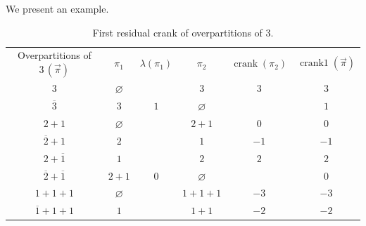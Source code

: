 \documentclass[10pt,a4paper]{amsart}
\numberwithin{equation}{section}
\begin{document}
We present an example.
\begin{table}[hbt!]\centering
\caption{First residual crank of overpartitions of $3$.}\label{t1}
\vspace{2mm}
\begin{tabular}{ c c c c c c }
Overpartitions of $3\,(\vec{\pi})$ & $\pi_1$ & $\lambda(\pi_1)$ & $\pi_2$ & $\operatorname{crank}(\pi_2)$ & $\operatorname{crank1}(\vec{\pi})$ \\
 $3$                         & $\varnothing$ &     &  $3$   & $3$ & $3$\\
 $\overline{3}$              & $3$    & $1$ & $\varnothing$ &     & $1$\\
 $2+1$                       & $\varnothing$ &     & $2+1$  & $0$ & $0$\\
 $\overline{2}+1$            & $2$    &     &  $1$   & \hspace{-3mm}$-1$& \hspace{-3mm}$-1$\\
 $2+\overline{1}$            & $1$    &     &  $2$   & $2$ & $2$\\
 $\overline{2}+\overline{1}$ & $2+1$  & $0$ & $\varnothing$ &     & $0$\\
 $1+1+1$                     & $\varnothing$ &     & $1+1+1$& \hspace{-3mm}$-3$& \hspace{-3mm}$-3$\\
 $\overline{1}+1+1$          & $1$    &     & $1+1$  & \hspace{-3mm}$-2$& \hspace{-3mm}$-2$
\end{tabular}
\end{table}
\end{document}

